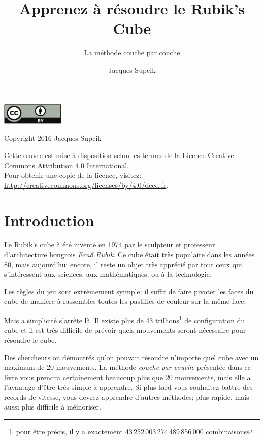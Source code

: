 \documentclass[10pt,paper=a5,pagesize]{scrbook}
\author{Jacques Supcik}
\title{Apprenez à résoudre le Rubik's Cube}
\subtitle{La méthode \og couche par couche\fg}
\begin{document}
\maketitle
\thispagestyle{empty}
\par\vspace*{\fill}
\includegraphics[width=30mm]{by.pdf}

Copyright \textcopyright{} 2016 Jacques Supcik

Cette œuvre est mise à disposition selon les termes de la Licence Creative Commons Attribution 4.0 International.
\medskip\\
Pour obtenir une copie de la licence, visitez:\\
\url{http://creativecommons.org/licenses/by/4.0/deed.fr}.
\newpage

\tableofcontents

\chapter{Introduction}

Le Rubik's cube à été inventé en 1974 par le sculpteur et professeur d'architecture hongrois \emph{Ernő Rubik}. Ce cube était très populaire
dans les années 80, mais aujourd'hui encore, il reste un objet très apprécié
par tout ceux qui s'intéressent aux sciences, aux mathématiques, ou à la technologie.

Les règles du jeu sont extrèmement syimple: il suffit de faire pivoter les faces du cube de manière à rassembles toutes les pastilles de couleur sur la même face:

\begin{center}
	\RubikCubeSolved
\end{center}


Mais a simplicité s'arrête là. Il existe plus de 43 trillions\footnote{pour être précis, il y a exactement 43\,252\,003\,274\,489\,856\,000 combinaisons} de configuration du cube et il est très difficile de prévoir quels mouvements seront nécessaire pour résoudre le cube.

Des chercheurs on démontrés\cite{god20} qu'on pouvait résoudre n'importe quel cube avec un maximum de 20 mouvements. La méthode \emph{couche par couche} présentée dans ce livre vous prendra certainement beaucoup plus que 20 mouvements, mais elle a l'avantage d'être très simple à apprendre. Si plus
tard vous souhaitez battre des records de vitesse, vous devrez apprendre
d'autres méthodes; plus rapide, mais aussi plus difficile à mémoriser.
 
\end{document}
